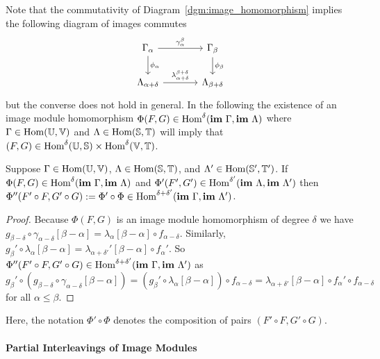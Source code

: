 Note that the commutativity of Diagram~\ref{dgm:image_homomorphism} implies the following diagram of images commutes
\begin{equation}
  \begin{tikzcd}[column sep=large]
    \Gamma_\alpha\arrow{r}{\gamma_\alpha^\beta}\arrow{d}{\phi_\alpha} &
    \Gamma_\beta\arrow{d}{\phi_\beta}\\
    \Lambda_{\alpha+\delta}\arrow{r}{\lambda_{\alpha+\delta}^{\beta+\delta}} &
    \Lambda_{\beta +\delta}
\end{tikzcd}\end{equation}
but the converse does not hold in general.
%
In the following the existence of an image module homomorphism $\Phi(F, G)\in\mathrm{Hom}^\delta(\mathbf{im}~\Gamma, \mathbf{im}~\Lambda)$ where $\Gamma\in\mathrm{Hom}(\mathbb{U},\mathbb{V})$ and $\Lambda\in\mathrm{Hom}(\mathbb{S},\mathbb{T})$  will imply that $(F,G)\in\mathrm{Hom}^\delta(\mathbb{U},\mathbb{S})\times \mathrm{Hom}^\delta(\mathbb{V},\mathbb{T})$.


\begin{lemma}\label{lem:image_composition}
  Suppose $\Gamma\in\mathrm{Hom}(\mathbb{U},\mathbb{V})$, $\Lambda\in\mathrm{Hom}(\mathbb{S},\mathbb{T})$, and $\Lambda'\in\mathrm{Hom}(\mathbb{S}',\mathbb{T}')$.
  If $\Phi(F, G)\in\mathrm{Hom}^\delta(\mathbf{im}~\Gamma, \mathbf{im}~\Lambda)$ and $\Phi'(F', G')\in\mathrm{Hom}^{\delta'}(\mathbf{im}~\Lambda, \mathbf{im}~\Lambda')$ then $\Phi''(F'\circ F, G'\circ G) := \Phi'\circ\Phi\in\mathrm{Hom}^{\delta+\delta'}(\mathbf{im}~\Gamma,\mathbf{im}~\Lambda')$.
\end{lemma}
\begin{proof}
  Because $\Phi(F, G)$ is an image module homomorphism of degree $\delta$ we have $g_{\beta-\delta}\circ\gamma_{\alpha-\delta}[\beta-\alpha] = \lambda_\alpha[\beta-\alpha]\circ f_{\alpha-\delta}$.
  Similarly, $g_{\beta}'\circ\lambda_{\alpha}[\beta-\alpha] = \lambda_{\alpha +\delta'}'[\beta-\alpha]\circ f_{\alpha}'$.
  So $\Phi''(F'\circ F, G'\circ G)\in\mathrm{Hom}^{\delta+\delta'}(\mathbf{im}~\Gamma,\mathbf{im}~\Lambda')$ as
  \[ g_\beta'\circ (g_{\beta-\delta}\circ \gamma_{\alpha-\delta}[\beta-\alpha]) = (g_\beta'\circ \lambda_\alpha[\beta-\alpha])\circ f_{\alpha-\delta} =\lambda_{\alpha+\delta'}[\beta-\alpha]\circ f_\alpha'\circ f_{\alpha-\delta}\]
  for all $\alpha\leq\beta$.
\end{proof}

Here, the notation $\Phi'\circ \Phi$ denotes the composition of pairs $(F'\circ F, G'\circ G)$.

\paragraph{Partial Interleavings of Image Modules}


